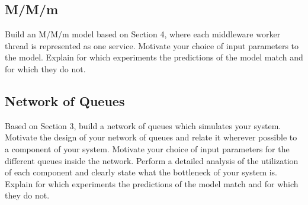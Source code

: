 \documentclass[11pt,a4paper]{article}
\begin{document}
\subsection{M/M/m}

Build an M/M/m model based on Section 4, where each middleware worker thread is represented as one service.  Motivate your choice of input parameters to the model. Explain for which experiments the predictions of the model match and for which they do not.

\subsection{Network of Queues}

Based on Section 3, build a network of queues which simulates your system. Motivate the design of your network of queues and relate it wherever possible to a component of your system. Motivate your choice of input parameters for the different queues inside the network. Perform a detailed analysis of the utilization of each component and clearly state what the bottleneck of your system is. Explain for which experiments the predictions of the model match and for which they do not.
\end{document}
